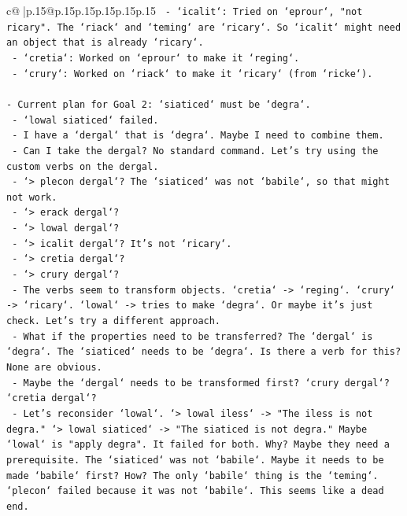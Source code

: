 \documentclass{article}
\begin{document}
{\begin{supertabular}{c@{$\;$}|p{.15\linewidth}@{}p{.15\linewidth}p{.15\linewidth}p{.15\linewidth}p{.15\linewidth}p{.15\linewidth}}
{{{\texttt{    {-} `icalit`: Tried on `eprour`, "not ricary". The `riack` and `teming` are `ricary`. So `icalit` might need an object that is already `ricary`.} \\
\texttt{    {-} `cretia`: Worked on `eprour` to make it `reging`.} \\
\texttt{    {-} `crury`: Worked on `riack` to make it `ricary` (from `ricke`).} \\
\\ 
\texttt{{-} Current plan for Goal 2: `siaticed` must be `degra`.} \\
\texttt{    {-} `lowal siaticed` failed.} \\
\texttt{    {-} I have a `dergal` that is `degra`. Maybe I need to combine them.} \\
\texttt{    {-} Can I take the dergal? No standard command. Let's try using the custom verbs on the dergal.} \\
\texttt{    {-} `> plecon dergal`? The `siaticed` was not `babile`, so that might not work.} \\
\texttt{    {-} `> erack dergal`?} \\
\texttt{    {-} `> lowal dergal`?} \\
\texttt{    {-} `> icalit dergal`? It's not `ricary`.} \\
\texttt{    {-} `> cretia dergal`?} \\
\texttt{    {-} `> crury dergal`?} \\
\texttt{    {-} The verbs seem to transform objects. `cretia` {-}> `reging`. `crury` {-}> `ricary`. `lowal` {-}> tries to make `degra`. Or maybe it's just check. Let's try a different approach.} \\
\texttt{    {-} What if the properties need to be transferred? The `dergal` is `degra`. The `siaticed` needs to be `degra`. Is there a verb for this? None are obvious.} \\
\texttt{    {-} Maybe the `dergal` needs to be transformed first? `crury dergal`? `cretia dergal`?} \\
\texttt{    {-} Let's reconsider `lowal`. `> lowal iless` {-}> "The iless is not degra." `> lowal siaticed` {-}> "The siaticed is not degra." Maybe `lowal` is "apply degra". It failed for both. Why? Maybe they need a prerequisite. The `siaticed` was not `babile`. Maybe it needs to be made `babile` first? How? The only `babile` thing is the `teming`. `plecon` failed because it was not `babile`. This seems like a dead end.} \\
\\ 
}}}
\end{supertabular}}
\end{document}
